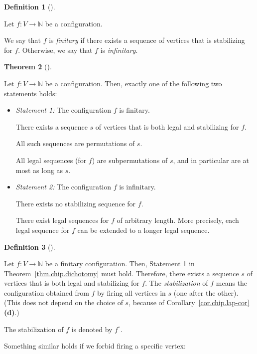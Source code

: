 \documentclass[numbers=enddot,12pt,final,onecolumn,notitlepage]{scrartcl}%
\theoremstyle{definition}
\newtheorem{theo}{Theorem}[section]
\newenvironment{theorem}[1][]
{\begin{theo}[#1]\begin{leftbar}}
{\end{leftbar}\end{theo}}
\newtheorem{defi}[theo]{Definition}
\newenvironment{definition}[1][]
{\begin{defi}[#1]\begin{leftbar}}
{\end{leftbar}\end{defi}}
\newcommand{\NN}{\mathbb{N}}
\begin{document}
\begin{definition}
Let $f : V \to \NN$ be a configuration.

We say that $f$ is \textit{finitary} if there
exists a sequence of vertices that is stabilizing for $f$.
Otherwise, we say that $f$ is \textit{infinitary}.
\end{definition}

\begin{theorem} \label{thm.chip.dichotomy}
Let $f : V \to \NN$ be a configuration.
Then, exactly one of the following two statements holds:

\begin{itemize}
\item \textit{Statement 1:}
      The configuration $f$ is finitary. \par
      There exists a sequence $s$ of vertices that is both
      legal and stabilizing for $f$. \par
      All such sequences are permutations of $s$.
      \par
      All legal sequences (for $f$) are subpermutations
      of $s$, and in particular are at most as long as $s$.

\item \textit{Statement 2:}
      The configuration $f$ is infinitary. \par
      There exists no stabilizing sequence for $f$. \par
      There exist legal sequences for $f$ of arbitrary length.
      More precisely, each legal sequence for $f$ can be
      extended to a longer legal sequence.
\end{itemize}
\end{theorem}

\begin{definition} \label{def.chip.stabilization}
Let $f : V \to \NN$ be a finitary configuration.
Then, Statement 1 in Theorem~\ref{thm.chip.dichotomy} must
hold.
Therefore, there exists a sequence $s$ of vertices that is both
legal and stabilizing for $f$.
The \textit{stabilization} of $f$ means
the configuration obtained from $f$ by firing
all vertices in $s$ (one after the other).
(This does not depend on the choice of $s$, because of
Corollary~\ref{cor.chip.lap-cor} \textbf{(d)}.)

The stabilization of $f$ is denoted by $f^\circ$.
\end{definition}

Something similar holds if we forbid firing a specific
vertex:
\end{document}

